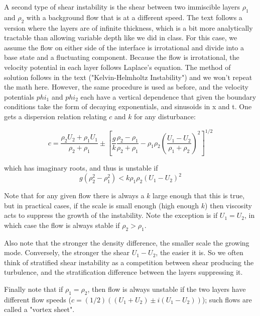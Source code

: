 \documentclass[11pt]{article}
\begin{document}
A second type of shear instability is the shear between two immiscible layers $\rho_1$ and $\rho_2$ with a background flow that is at a different speed.  The text follows a version where the layers are of infinite thickness, which is a bit more analytically tractable than allowing variable depth like we did in class.  For this case, we assume the flow on either side of the interface is irrotational and divide into a base state and a fluctuating component.  Because the flow is irrotational, the velocity potential in each layer follows Laplace's equation.  The method of solution follows in the text ("Kelvin-Helmholtz Instability") and we won't repeat the math here.  However, the same procedure is used as before, and the velocity potentials $phi_1$ and $phi_2$ each have a vertical dependence that given the boundary conditions take the form of decaying exponentials, and sinusoids in x and t.  One gets a dispersion relation relating $c$ and $k$ for any disturbance:

\begin{equation}
  c  = \frac{\rho_2 U_2 + \rho_1 U_1}{\rho_2 + \rho_1} \pm \left[\frac{g}{k}\frac{\rho_2 - \rho_1}{\rho_2+\rho_1} - \rho_1\rho_2\left(\frac{U_1 - U_2}{\rho_1 + \rho_2} \right)^2 \right]^{1/2}
\end{equation}

which has imaginary roots, and thus is unstable if 
\begin{equation}
  g\left(\rho_2^2 - \rho_1^2 \right) < k\rho_1\rho_2\left(U_1-U_2\right)^2
\end{equation}

Note that for any given flow there is always a $k$ large enough that this is true, but in practical cases, if the scale is small enough (high enough $k$) then viscosity acts to suppress the growth of the instability.  Note the exception is if $U_1=U_2$, in which case the flow is always stable if $\rho_2 > \rho_1$.  

Also note that the stronger the density difference, the smaller scale the growing mode.  Conversely, the stronger the shear $U_1-U_2$, the easier it is.  So we often think of stratified shear instability as a competition between shear producing the turbulence, and the stratification difference between the layers suppressing it.  

Finally note that if $\rho_1 = \rho_2$, then flow is always unstable if the two layers have different flow speeds ($c = (1/2)\left((U_1 + U_2)\pm i(U_1-U_2)\right)$); such flows are called a "vortex sheet".  
\end{document}
